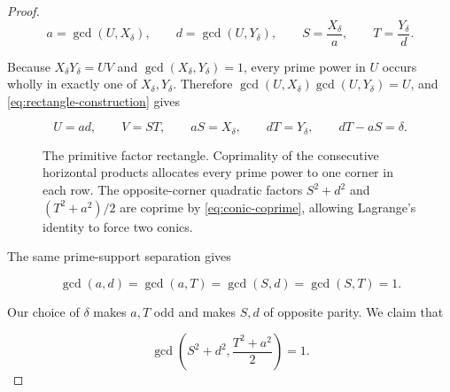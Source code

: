 \begin{proof}
\begin{equation}
 a=\gcd(U,X_\delta),
 \qquad
 d=\gcd(U,Y_\delta),
 \qquad
 S=\frac{X_\delta}{a},
 \qquad
 T=\frac{Y_\delta}{d}.
 \label{eq:rectangle-construction}
\end{equation}

Because $X_\delta Y_\delta=UV$ and
$\gcd(X_\delta,Y_\delta)=1$, every prime power in $U$ occurs wholly in
exactly one of $X_\delta,Y_\delta$. Therefore
$\gcd(U,X_\delta)\gcd(U,Y_\delta)=U$, and
\cref{eq:rectangle-construction} gives

\begin{equation}
 U=ad,
 \qquad
 V=ST,
 \qquad
 aS=X_\delta,
 \qquad
 dT=Y_\delta,
 \qquad
 dT-aS=\delta.
\label{eq:rectangle}
\end{equation}

\begin{figure}[t]
\centering
{}
\caption{The primitive factor rectangle. Coprimality of the consecutive
horizontal products allocates every prime power to one corner in each row.
The opposite-corner quadratic factors $S^2+d^2$ and
$(T^2+a^2)/2$ are coprime by \cref{eq:conic-coprime}, allowing Lagrange's
identity to force two conics.}
\label{fig:primitive-rectangle}
\end{figure}

The same prime-support separation gives

\begin{equation}
 \gcd(a,d)=\gcd(a,T)=\gcd(S,d)=\gcd(S,T)=1.
 \label{eq:rectangle-cross-coprime}
\end{equation}

Our choice of $\delta$ makes $a,T$ odd and makes $S,d$ of opposite parity.
We claim that

\begin{equation}
 \gcd\left(S^2+d^2,\frac{T^2+a^2}{2}\right)=1.
 \label{eq:conic-coprime}
\end{equation}


\end{proof}
